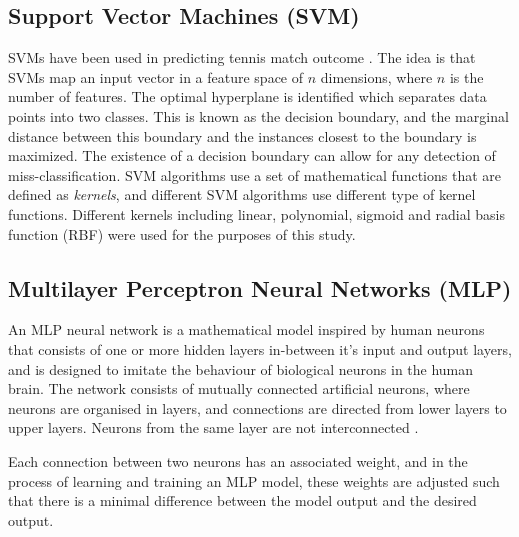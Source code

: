 \subsection{Support Vector Machines (SVM)}
SVMs have been used in predicting tennis match outcome \cite{cornman2017machine}. The idea is that SVMs map an input vector in a feature space of $n$ dimensions, where $n$ is the number of features. The optimal hyperplane is identified which separates data points into two classes. This is known as the decision boundary, and the marginal distance between this boundary and the instances closest to the boundary is maximized. The existence of a decision boundary can allow for any detection of miss-classification. SVM algorithms use a set of mathematical functions that are defined as \textit{kernels}, and different SVM algorithms use different type of kernel functions. Different kernels including linear, polynomial, sigmoid and radial basis function (RBF) were used for the purposes of this study.

\subsection{Multilayer Perceptron Neural Networks (MLP)}
An MLP neural network is a mathematical model inspired by human neurons that consists of one or more hidden layers in-between it's input and output layers, and is designed to imitate the behaviour of biological neurons in the human brain. The network consists of mutually connected artificial neurons, where neurons are organised in layers, and connections are directed from lower layers to upper layers. Neurons from the same layer are not interconnected \cite{noriega2005multilayer}.

Each connection between two neurons has an associated weight, and in the process of learning and training an MLP model, these weights are adjusted such that there is a minimal difference between the model output and the desired output. 